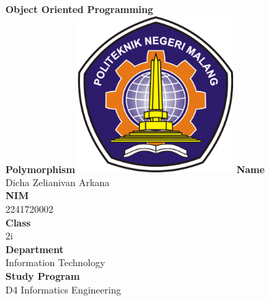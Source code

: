 \documentclass[12pt,titlepage]{article}
\newcommand{\vSubject}{Object Oriented Programming}
\newcommand{\vSubtitle}{Polymorphism}
\newcommand{\vName}{Dicha Zelianivan Arkana}
\newcommand{\vNIM}{2241720002}
\newcommand{\vClass}{2i}
\newcommand{\vDepartment}{Information Technology}
\newcommand{\vStudyProgram}{D4 Informatics Engineering}
\begin{document}
\begin{titlepage}
    \centering
    \vfill
    {\bfseries\LARGE
        \vSubject\\
        \vskip0.25cm
        \vSubtitle
    }
    \vfill
    \includegraphics[width=6cm]{images/polinema-logo.png}
    \vfill
    {
        \textbf{Name}\\
        \vName\\
        \vskip0.5cm
        \textbf{NIM}\\
        \vNIM\\
        \vskip0.5cm
        \textbf{Class}\\
        \vClass\\
        \vskip0.5cm
        \textbf{Department}\\
        \vDepartment\\
        \vskip0.5cm
        \textbf{Study Program}\\
        \vStudyProgram
    }
\end{titlepage}
\end{document}
